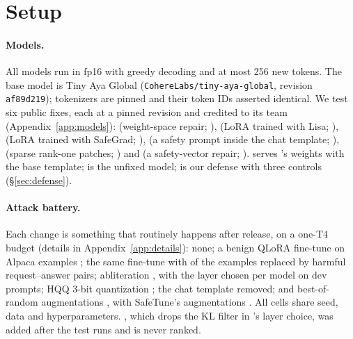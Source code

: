 \section{Setup}
\label{sec:setup}

\paragraph{Models.} All models run in fp16 with greedy decoding and at most 256 new tokens. The base model is
Tiny Aya Global (\texttt{CohereLabs/\allowbreak tiny-aya-global}, revision \texttt{af89d219}); tokenizers are pinned and their token IDs asserted identical. We test six public
fixes, each at a pinned revision and credited to its team (Appendix~\ref{app:models}):  (weight-space
repair; \citealp{dhruvparmar2026sdt}),  (LoRA trained with Lisa; \citealp{vasmisas2026gc,huang2024lisa}),
 (LoRA trained with SafeGrad; \citealp{sykeclonex2026il,yi2025safegrad}),  (a safety prompt inside
the chat template; \citealp{amberneel2026rl}),  (sparse rank-one patches; \citealp{amugoodbad2292026st})
and  (a safety-vector repair; \citealp{purvansh012026sp}).  serves 's weights with the base template;
 is the unfixed model;  is our defense with three controls (\S\ref{sec:defense}).

\paragraph{Attack battery.} Each change is something that routinely happens after release, on a one-T4 budget
(details in Appendix~\ref{app:details}):  none;  a benign QLoRA fine-tune
\citep{dettmers2023qlora} on  Alpaca examples \citep{taori2023alpaca};  the same fine-tune with 
of the examples replaced by harmful request--answer pairs;  abliteration \citep{arditi2024refusal}, with the
layer chosen per model on dev prompts;  HQQ 3-bit quantization \citep{badri2023hqq};  the chat template removed; and
 best-of- random augmentations \citep{hughes2024bon}, with SafeTune's augmentations \citep{seth2026safetuneunifiedfaithfullibrary}. All cells share seed, data and
hyperparameters. , which drops the KL filter in 's layer choice, was added after the test runs and
is never ranked.

